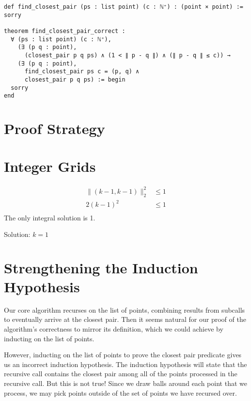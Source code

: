 \documentclass{article}
\begin{document}
\begin{verbatim}
def find_closest_pair (ps : list point) (c : ℕ⁺) : (point × point) := sorry

theorem find_closest_pair_correct :
  ∀ (ps : list point) (c : ℕ⁺),
    (∃ (p q : point),
      (closest_pair p q ps) ∧ (1 < ∥ p - q ∥) ∧ (∥ p - q ∥ ≤ c)) →
    (∃ (p q : point),
      find_closest_pair ps c = (p, q) ∧
      closest_pair p q ps) := begin
  sorry
end
\end{verbatim}

\section{Proof Strategy}


\section{Integer Grids}
\begin{align*}
  \| (k - 1, k-1) \|_2^2 &\leq 1 \\
  2(k-1)^2 & \leq 1 \\
\end{align*}
The only integral solution is 1.

Solution: $k=1$

\section{Strengthening the Induction Hypothesis}
Our core algorithm recurses on the list of points, combining results from subcalls to eventually arrive at the closest pair.
Then it seems natural for our proof of the algorithm's correctness to mirror its definition, which we could achieve by inducting on the list of points.

However, inducting on the list of points to prove the closest pair predicate gives us an incorrect induction hypothesis.
The induction hypothesis will state that the recursive call contains the closest pair among all of the points processed in the recursive call.
But this is not true!
Since we draw balls around each point that we process, we may pick points outside of the set of points we have recursed over.
\end{document}
